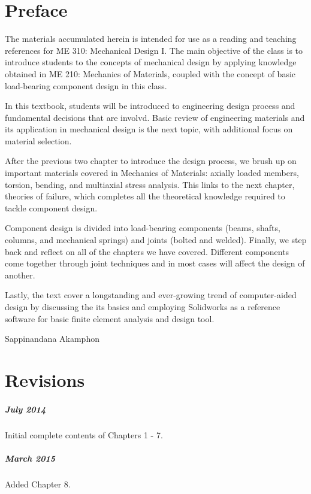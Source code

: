 \documentclass[
10pt,
a4paper,
openany,
svgnames,
]{book}
\begin{document}
\chapter*{Preface}

The materials accumulated herein is intended for use as a reading and teaching references for ME 310: Mechanical Design I. The main objective of the class is to introduce students to the concepts of mechanical design by applying knowledge obtained in ME 210: Mechanics of Materials, coupled with the concept of basic load-bearing component design in this class.

In this textbook, students will be introduced to engineering design process and fundamental decisions that are involvd.  Basic review of engineering materials and its application in mechanical design is the next topic, with additional focus on material selection.

After the previous two chapter to introduce the design process, we brush up on important materials covered in Mechanics of Materials: axially loaded members, torsion, bending, and multiaxial stress analysis. This links to the next chapter, theories of failure, which completes all the theoretical knowledge required to tackle component design.

Component design is divided into load-bearing components (beams, shafts, columns, and mechanical springs) and joints (bolted and welded). Finally, we step back and reflect on all of the chapters we have covered. Different components come together through joint techniques and in most cases will affect the design of another.

Lastly, the text cover a longstanding and ever-growing trend of computer-aided design by discussing the its basics and employing Solidworks as a reference software for basic finite element analysis and design tool.

\vspace{2cm}\hspace{10cm} Sappinandana Akamphon


\chapter*{Revisions}

\paragraph{July 2014}
Initial complete contents of Chapters 1 - 7.

\paragraph{March 2015}
Added Chapter 8.
\end{document}
